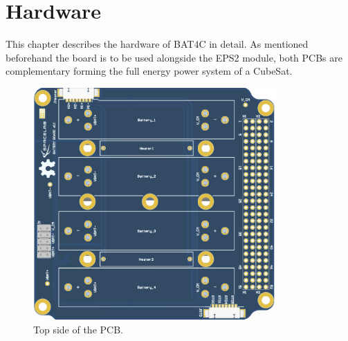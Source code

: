 %
%
%
%
%

%
%
%
%
%
%

\chapter{Hardware} \label{ch:hardware}

This chapter describes the hardware of BAT4C in detail. As mentioned beforehand the board is to be used alongside the EPS2 module, both PCBs are complementary forming the full energy power system of a CubeSat.
  
\begin{figure}[!ht]
    \begin{center}
        \includegraphics[width=93mm]{figures/bat4c-pcb-top.png}
        \caption{Top side of the PCB.}
        \label{fig:pcb-top}
    \end{center}
\end{figure}

